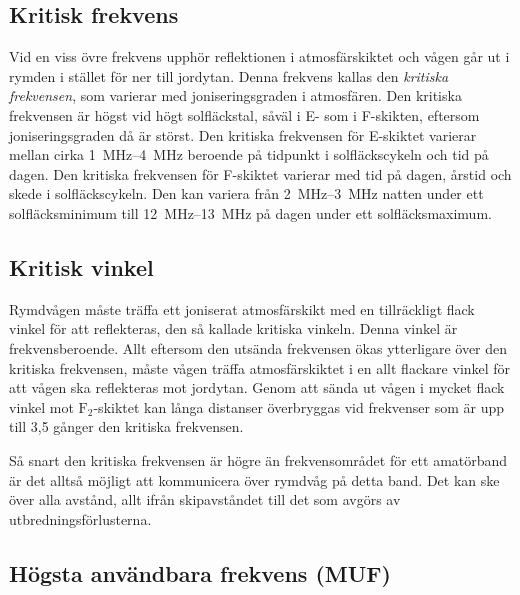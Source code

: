 \subsection{Kritisk frekvens}

Vid en viss övre frekvens upphör reflektionen i atmosfärskiktet och
vågen går ut i rymden i stället för ner till jordytan.
Denna frekvens kallas den \emph{kritiska frekvensen}, som varierar med
joniseringsgraden i atmosfären.
Den kritiska frekvensen är högst vid högt solfläckstal, såväl i E- som i
F-skikten, eftersom joniseringsgraden då är störst.
Den kritiska frekvensen för E-skiktet varierar mellan cirka
\SIrange{1}{4}{\mega\hertz} beroende på tidpunkt i solfläckscykeln och tid på
dagen.
Den kritiska frekvensen för F-skiktet varierar med tid på dagen, årstid och
skede i solfläckscykeln.
Den kan variera från \SIrange{2}{3}{\mega\hertz} natten under ett
solfläcksminimum till \SIrange{12}{13}{\mega\hertz} på dagen under ett
solfläcksmaximum.

\subsection{Kritisk vinkel}

Rymdvågen måste träffa ett joniserat atmosfärskikt med en tillräckligt
flack vinkel för att reflekteras, den så kallade kritiska vinkeln.
Denna vinkel är frekvensberoende.
Allt eftersom den utsända frekvensen ökas ytterligare över den kritiska
frekvensen, måste vågen träffa atmosfärskiktet i en allt flackare vinkel för att
vågen ska reflekteras mot jordytan.
Genom att sända ut vågen i mycket flack vinkel mot \(\mathrm{F_2}\)-skiktet kan
långa distanser överbryggas vid frekvenser som är upp till 3,5 gånger den
kritiska frekvensen.

Så snart den kritiska frekvensen är högre än frekvensområdet för ett
amatörband är det alltså möjligt att kommunicera över rymdvåg på detta band.
Det kan ske över alla avstånd, allt ifrån skipavståndet till det som avgörs av
utbredningsförlusterna.

\subsection{Högsta användbara frekvens (MUF)}

